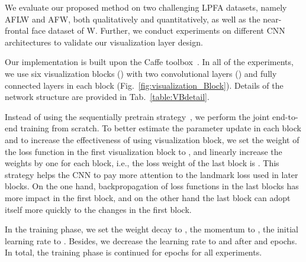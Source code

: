 \vspace{-2mm}
\label{Sec:Exp}
\vspace{-3mm}
We evaluate our proposed method on two challenging LPFA datasets, namely AFLW and AFW, both qualitatively and quantitatively, as well as the near-frontal face dataset of W. 
Further, we conduct experiments on different CNN architectures to validate our visualization layer design. 

Our implementation is built upon the Caffe toolbox~\cite{jia2014caffe}. 
In all of the experiments, we use six visualization blocks () with two convolutional layers () and fully connected layers in each block (Fig.~\ref{fig:visualization_Block}). 
Details of the network structure are provided in Tab.~\ref{table:VBdetail}. 

Instead of using the sequentially pretrain strategy~\cite{yan2015hd}, we perform the joint end-to-end training from scratch. 
To better estimate the parameter update in each block and to increase the effectiveness of using visualization block, we set the weight of the loss function in the first visualization block to , and linearly increase the weights by one for each block, i.e., the loss weight of the last block is .
This strategy helps the CNN to pay more attention to the landmark loss used in later blocks. 
On the one hand, backpropagation of loss functions in the last blocks has more impact in the first block, and on the other hand the last block can adopt itself more quickly to the changes in the first block.  

In the training phase, we set the weight decay to , the momentum to , the initial learning rate to . 
Besides, we decrease the learning rate to  and  after  and  epochs. 
In total, the training phase is continued for  epochs for all experiments. 

